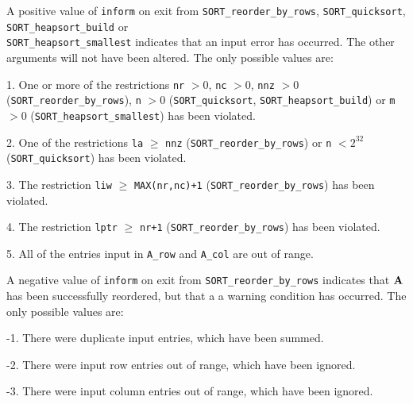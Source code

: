 \documentclass{galahad}
\newcommand{\packagename}{SORT}
\begin{document}

\galerrors
A positive value of {\tt inform} on exit from 
{\tt \packagename\_reorder\_by\_rows},
{\tt \packagename\_quicksort},
{\tt \packagename\_heapsort\_build}
or \\
{\tt \packagename\_heapsort\_smallest}
indicates that an input error has occurred. 
The other arguments will not have been altered.
The only possible values are:

\begin{description}
\item{1.} One or more of the restrictions 
{\tt nr} $> 0$,
{\tt nc} $> 0$,
{\tt nnz} $> 0$
({\tt \packagename\_reorder\_by\_rows}),
{\tt n} $> 0$ ({\tt \packagename\_quicksort},
{\tt \packagename\_heapsort\_build})
or {\tt m} $> 0$ ({\tt \packagename\_heapsort\_smallest})
has been violated. 
\item{2.} One of the restrictions
{\tt la} $\geq$ {\tt nnz}
({\tt \packagename\_reorder\_by\_rows})
or 
{\tt n} $< 2^{32}$ ({\tt \packagename\_quicksort})
has been violated.
\item{3.} The restriction 
{\tt liw} $\geq$ {\tt MAX(nr,nc)+1}
({\tt \packagename\_reorder\_by\_rows})
has been violated.
\item{4.} The restriction 
{\tt lptr} $\geq$ {\tt nr+1}
({\tt \packagename\_reorder\_by\_rows})
has been violated.
\item{5.} All of the entries input in {\tt A\_row} and {\tt A\_col}
are out of range.
\end{description}

A negative value of {\tt inform} on exit from 
{\tt \packagename\_reorder\_by\_rows} indicates 
that ${\mathbf{A}}$ has been successfully reordered, but that a 
a warning condition has occurred.
The only possible values are:

\begin{description}
\item{-1.} There were duplicate input entries, which have been summed.
\item{-2.} There were input row entries out of range, which have been ignored.
\item{-3.} There were input column entries out of range, which have been 
ignored.
\end{description}


\galgeneral
\end{document}
